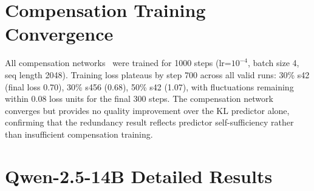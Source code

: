 \section{Compensation Training Convergence}
\label{app:comp_convergence}

All compensation networks~\cite{gautam2026fastforward} were trained for 1000 steps (lr=$10^{-4}$, batch size 4, seq length 2048). Training loss plateaus by step 700 across all valid runs: 30\% s42 (final loss 0.70), 30\% s456 (0.68), 50\% s42 (1.07), with fluctuations remaining within 0.08 loss units for the final 300 steps. The compensation network converges but provides no quality improvement over the KL predictor alone, confirming that the redundancy result reflects predictor self-sufficiency rather than insufficient compensation training. %


\section{Qwen-2.5-14B Detailed Results}
\label{app:14b}

\begin{table}[h]
\centering
\caption{Qwen-2.5-14B at 30\% nominal sparsity. Actual sparsity differs: KL 29.6\% (3-seed), TEAL 29.3\% (target 30\%). \textbf{Bold}: best sparse per column per group. BCE collapses to 6.4\% native sparsity (\S\ref{sec:method:gradient}), so forced global top-$k$ is used.}
\label{tab:14b}
\small
{}
\end{table}

